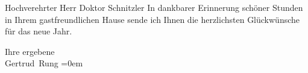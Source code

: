 \pstart{}Hochverehrter Herr Doktor Schnitzler\pend\vspace{0.5em}
\pstart
           In dankbarer Erinnerung schöner Stunden in Ihrem gastfreundlichen Hause sende ich
               Ihnen die herzlichsten Glückwünsche für das neue Jahr.\pend
           
\pstart
           Ihre ergebene{\\[\baselineskip]}\spacefill\mbox{Gertrud Rung}\pend
           \leftskip=0em{}\endnumbering{}  \newcommand{\dateiname}{L02463}\newcommand{\titel}{Gertrud Rung an Arthur Schnitzler, 30. 12. 1925}\newcommand{\editorInnen}{Martin Anton Müller und Gerd-Hermann Susen}
